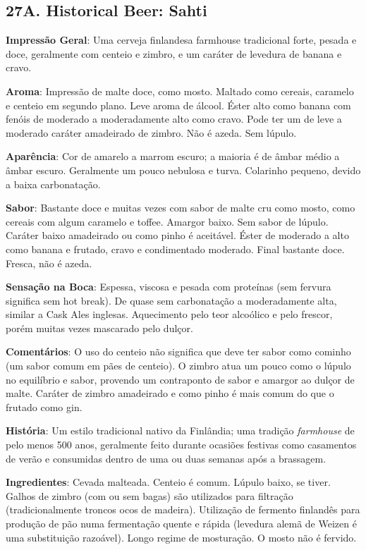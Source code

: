 \subsection*{27A. Historical Beer: Sahti}
\textbf{Impressão Geral}: Uma cerveja finlandesa farmhouse tradicional forte, pesada e doce, geralmente com centeio e zimbro, e um caráter de levedura de banana e cravo.

\textbf{Aroma}: Impressão de malte doce, como mosto. Maltado como cereais, caramelo e centeio em segundo plano. Leve aroma de álcool. Éster alto como banana com fenóis de moderado a moderadamente alto como cravo. Pode ter um de leve a moderado caráter amadeirado de zimbro. Não é azeda. Sem lúpulo.

\textbf{Aparência}: Cor de amarelo a marrom escuro; a maioria é de âmbar médio a âmbar escuro. Geralmente um pouco nebulosa e turva. Colarinho pequeno, devido a baixa carbonatação.

\textbf{Sabor}: Bastante doce e muitas vezes com sabor de malte cru como mosto, como cereais com algum caramelo e toffee. Amargor baixo. Sem sabor de lúpulo. Caráter baixo amadeirado ou como pinho é aceitável. Éster de moderado a alto como banana e frutado, cravo e condimentado moderado. Final bastante doce. Fresca, não é azeda.

\textbf{Sensação na Boca}: Espessa, viscosa e pesada com proteínas (sem fervura significa sem hot break). De quase sem carbonatação a moderadamente alta, similar a Cask Ales inglesas. Aquecimento pelo teor alcoólico e pelo frescor, porém muitas vezes mascarado pelo dulçor.

\textbf{Comentários}: O uso do centeio não significa que deve ter sabor como cominho (um sabor comum em pães de centeio). O zimbro atua um pouco como o lúpulo no equilíbrio e sabor, provendo um contraponto de sabor e amargor ao dulçor de malte. Caráter de zimbro amadeirado e como pinho é mais comum do que o frutado como gin.

\textbf{História}: Um estilo tradicional nativo da Finlândia; uma tradição \textit{farmhouse} de pelo menos 500 anos, geralmente feito durante ocasiões festivas como casamentos de verão e consumidas dentro de uma ou duas semanas após a brassagem.

\textbf{Ingredientes}: Cevada malteada. Centeio é comum. Lúpulo baixo, se tiver. Galhos de zimbro (com ou sem bagas) são utilizados para filtração (tradicionalmente troncos ocos de madeira). Utilização de fermento finlandês para produção de pão numa fermentação quente e rápida (levedura alemã de Weizen é uma substituição razoável). Longo regime de mosturação. O mosto não é fervido.

